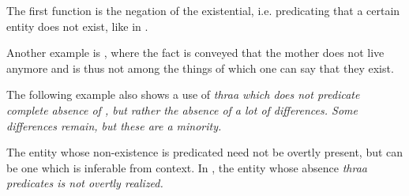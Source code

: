 The first function is the negation of the existential, i.e. predicating that a certain entity does not exist, like  in .



Another example is , where the fact is conveyed that the mother does not live anymore and is thus not among the things of which one can say that they exist.



 The following example also shows a use of \em thraa \em which does not predicate complete absence of , but rather the absence of a lot of differences. Some differences remain, but these are a minority.



The entity whose non-existence is predicated need not be overtly present, but can be one which is inferable from context. In , the entity whose absence \em thraa \em predicates is not overtly realized.











